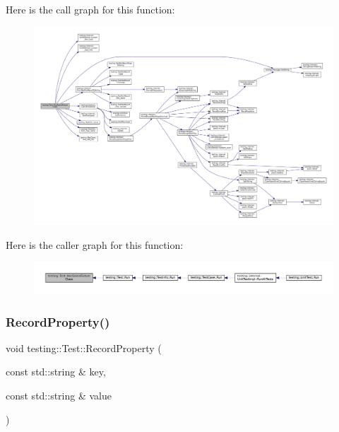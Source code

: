 Here is the call graph for this function\+:
\nopagebreak
\begin{figure}[H]
\begin{center}
\leavevmode
\includegraphics[width=350pt]{classtesting_1_1Test_a5daca5a35e33e8fbdf36b7b666668b34_cgraph}
\end{center}
\end{figure}
Here is the caller graph for this function\+:
\nopagebreak
\begin{figure}[H]
\begin{center}
\leavevmode
\includegraphics[width=350pt]{classtesting_1_1Test_a5daca5a35e33e8fbdf36b7b666668b34_icgraph}
\end{center}
\end{figure}
\mbox{\label{classtesting_1_1Test_a7b20a48c0bbc9dd1fe96715e4a5c0164}} 
\subsubsection{\texorpdfstring{Record\+Property()}{RecordProperty()}\hspace{0.1cm}{\footnotesize\ttfamily [1/2]}}
{\footnotesize\ttfamily void testing\+::\+Test\+::\+Record\+Property (\begin{DoxyParamCaption}\item[{const std\+::string \&}]{key,  }\item[{const std\+::string \&}]{value }\end{DoxyParamCaption})\hspace{0.3cm}{\ttfamily [static]}}



